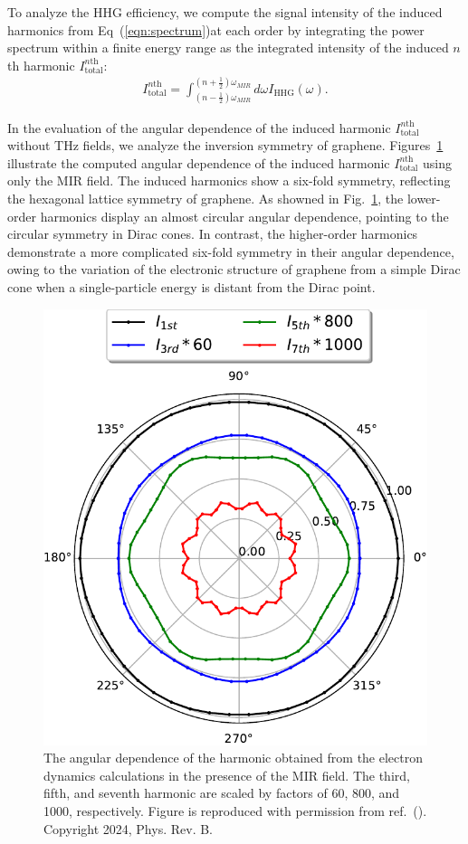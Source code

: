 To analyze the HHG efficiency, we compute the signal intensity of the induced harmonics from
Eq~(\ref{eqn:spectrum})at each
order by integrating the power spectrum within a finite energy range as  the integrated intensity
of the induced $n$th harmonic $I^{n \textrm{th}}_{\mathrm{total}}$:
\begin{align}
	I^{n \textrm{th}}_{\mathrm{total}} = \int_{\left (n-\frac{1}{2} \right )\omega_{MIR}}^{\left (n+\frac{1}{2} \right )\omega_{MIR}} d \omega I_{\textrm{HHG}} (\omega).
	\label{eqn:integrate_intensity}
\end{align}

In the evaluation of the angular dependence of the induced harmonic  $I^{n \textrm{th}}_{\mathrm{total}}$ without THz fields, we analyze the inversion symmetry of graphene. Figures~\ref{fig:SI_polar_mir} illustrate the computed angular dependence of the induced harmonic  $I^{n \textrm{th}}_{\mathrm{total}}$ using only the MIR field. The induced harmonics show a six-fold symmetry, reflecting the hexagonal lattice symmetry of graphene. As showned in Fig.~\ref{fig:SI_polar_mir}, the lower-order harmonics display an almost circular angular dependence, pointing to the circular symmetry in Dirac cones. In contrast, the higher-order harmonics demonstrate a more complicated six-fold symmetry in their angular dependence, owing to the variation of the electronic structure of graphene from a simple Dirac cone when a single-particle energy is distant from the Dirac point.
\begin{figure}[tb]
	\centering
	\includegraphics[width=0.50\linewidth]{pic/polar_mir.pdf}
	\caption{\label{fig:SI_polar_mir}
		The angular dependence of the harmonic  obtained from the electron dynamics calculations in the presence of the MIR field. The third, fifth, and seventh harmonic are scaled by factors of 60, 800, and 1000, respectively. Figure is reproduced with permission from ref.~(\cite{PhysRevB.109.045421}). Copyright 2024, Phys. Rev. B.
	}
\end{figure}
